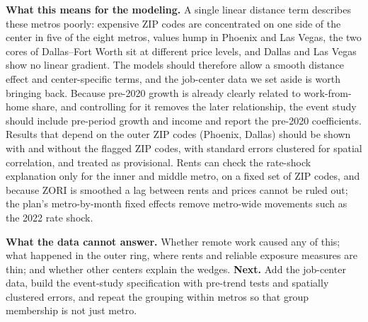 \documentclass[11pt]{article}
\begin{document}
\textbf{What this means for the modeling.} A single linear distance term describes these metros poorly: expensive ZIP codes are
concentrated on one side of the center in five of the eight metros, values hump in Phoenix and Las Vegas, the two cores of
Dallas--Fort Worth sit at different price levels, and Dallas and Las Vegas show no linear gradient. The models should therefore
allow a smooth distance effect and center-specific terms, and the job-center data we set aside is worth bringing back. Because
pre-2020 growth is already clearly related to work-from-home share, and controlling for it removes the later relationship, the
event study should include pre-period growth and income and report the pre-2020 coefficients. Results that depend on the outer ZIP
codes (Phoenix, Dallas) should be shown with and without the flagged ZIP codes, with standard errors clustered for spatial
correlation, and treated as provisional. Rents can check the rate-shock explanation only for the inner and middle metro, on a fixed
set of ZIP codes, and because ZORI is smoothed a lag between rents and prices cannot be ruled out; the plan's metro-by-month fixed
effects remove metro-wide movements such as the 2022 rate shock.

\textbf{What the data cannot answer.} Whether remote work caused any of this; what happened in the outer ring, where rents and
reliable exposure measures are thin; and whether other centers explain the wedges. \textbf{Next.} Add the job-center data, build
the event-study specification with pre-trend tests and spatially clustered errors, and repeat the grouping within metros so that
group membership is not just metro.
\end{document}
